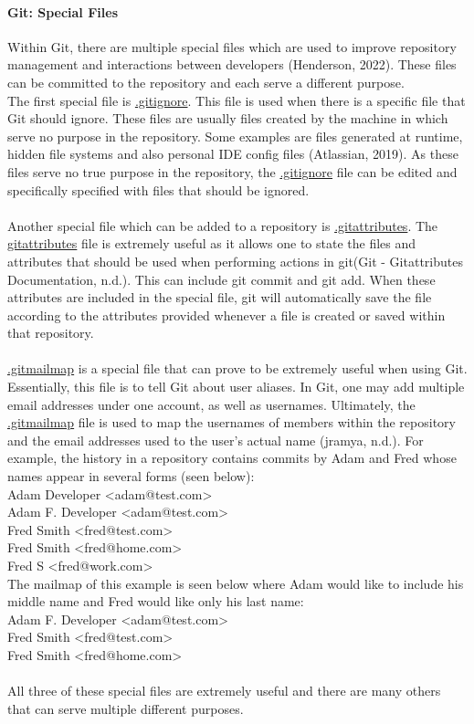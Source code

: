 \documentclass[a4paper, 11pt]{report}
\begin{document}
    \paragraph{Git: Special Files} Within Git, there are multiple special files which are used to improve repository management and interactions between developers (Henderson, 2022). These files can be committed to the repository and each serve a different purpose. 
    \\
    The first special file is \underline{.gitignore}. This file is used when there is a specific file that Git should ignore. These files are usually files created by the machine in which serve no purpose in the repository. Some examples are files generated at runtime, hidden file systems and also personal IDE config files (Atlassian, 2019). As these files serve no true purpose in the repository, the \underline{.gitignore} file can be edited and specifically specified with files that should be ignored. 
    \\
    \\
    Another special file which can be added to a repository is \underline{.gitattributes}. The \underline{gitattributes} file is extremely useful as it allows one to state the files and attributes that should be used when performing actions in git(Git - Gitattributes Documentation, n.d.). This can include git commit and git add. When these attributes are included in the special file, git will automatically save the file according to the attributes provided whenever a file is created or saved within that repository. 
    \\
    \\
    \noindent
    \underline{.gitmailmap} is a special file that can prove to be extremely useful when using Git. Essentially, this file is to tell Git about user aliases. In Git, one may add multiple email addresses under one account, as well as usernames. Ultimately, the \underline{.gitmailmap} file is used to map the usernames of members within the repository and the email addresses used to the user’s actual name (jramya, n.d.). For example, the history in a repository contains commits by Adam and Fred whose names appear in several forms (seen below):
    \\
    Adam Developer <adam@test.com>
    \\
    Adam F. Developer <adam@test.com>
    \\
    Fred Smith <fred@test.com>
    \\
    Fred Smith <fred@home.com>
    \\
    Fred S <fred@work.com>
    \\
    The mailmap of this example is seen below where Adam would like to include his middle name and Fred would like only his last name:
    \\
    Adam F. Developer <adam@test.com>
    \\
    Fred Smith <fred@test.com>
    \\
    Fred Smith <fred@home.com>
    \\
    \\
    All three of these special files are extremely useful and there are many others that can serve multiple different purposes. 
\end{document}
